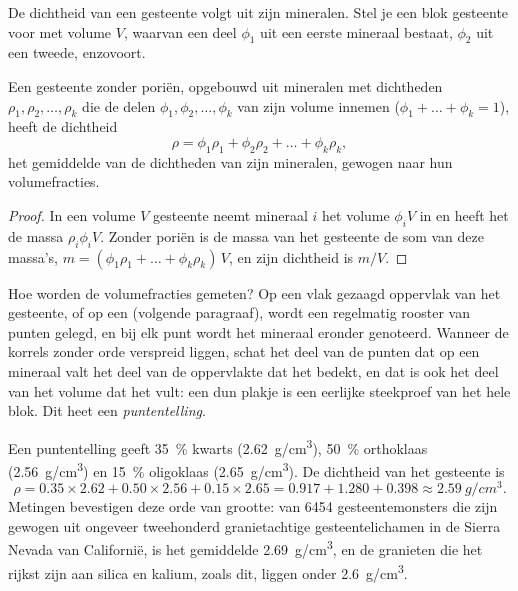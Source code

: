 De dichtheid van een gesteente volgt uit zijn mineralen. Stel je een blok gesteente voor met
volume $V$, waarvan een deel $\phi_1$ uit een eerste mineraal bestaat, $\phi_2$ uit een
tweede, enzovoort.

\begin{proposition}\label{prop:g11:minerals:density}
Een gesteente zonder poriën, opgebouwd uit mineralen met dichtheden $\rho_1, \rho_2, \dots,
\rho_k$ die de delen $\phi_1, \phi_2, \dots, \phi_k$ van zijn volume innemen
($\phi_1 + \dots + \phi_k = 1$), heeft de dichtheid
\[
  \rho = \phi_1 \rho_1 + \phi_2 \rho_2 + \dots + \phi_k \rho_k ,
\]
het gemiddelde van de dichtheden van zijn mineralen, gewogen naar hun
volumefracties.
\end{proposition}

\begin{proof}
In een volume $V$ gesteente neemt mineraal $i$ het volume $\phi_i V$ in en heeft het
de massa $\rho_i \phi_i V$. Zonder poriën is de massa van het gesteente de som van
deze massa's, $m = (\phi_1 \rho_1 + \dots + \phi_k \rho_k)\,V$, en zijn
dichtheid is $m/V$.
\end{proof}

Hoe worden de volumefracties gemeten? Op een vlak gezaagd oppervlak van het gesteente, of op
een  (volgende paragraaf), wordt een regelmatig rooster van punten gelegd, en bij
elk punt wordt het mineraal eronder genoteerd. Wanneer de korrels zonder orde
verspreid liggen, schat het deel van de punten dat op een mineraal valt
het deel van de oppervlakte dat het bedekt, en dat is ook het deel van het
volume dat het vult: een dun plakje is een eerlijke steekproef van het hele blok. Dit heet een
\emph{puntentelling}.

\begin{example}
Een puntentelling geeft \qty{35}{\percent} kwarts (\qty{2.62}{g/cm^3}),
\qty{50}{\percent} orthoklaas (\qty{2.56}{g/cm^3}) en \qty{15}{\percent}
oligoklaas (\qty{2.65}{g/cm^3}). De dichtheid van het gesteente is
\[
  \rho = 0.35 \times 2.62 + 0.50 \times 2.56 + 0.15 \times 2.65
       = 0.917 + 1.280 + 0.398 \approx \qty{2.59}{g/cm^3}.
\]
Metingen bevestigen deze orde van grootte: van \num{6454} gesteentemonsters
die zijn gewogen uit ongeveer tweehonderd granietachtige gesteentelichamen in de Sierra Nevada van
Californië, is het gemiddelde \qty{2.69}{g/cm^3}, en de granieten die het rijkst zijn aan
silica en kalium, zoals dit, liggen onder \qty{2.6}{g/cm^3}.
\end{example}

